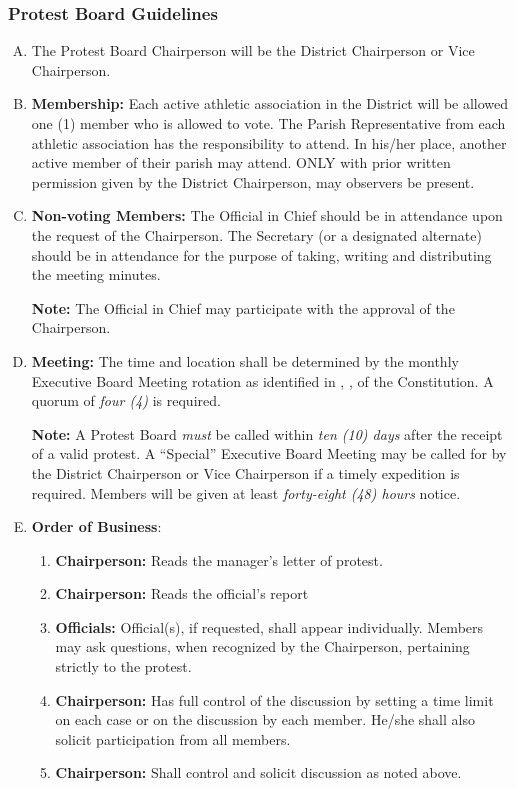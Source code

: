 \subsubsection{Protest Board Guidelines}
\begin{enumerate}[A.]
    \item The Protest Board Chairperson will be the District Chairperson or Vice Chairperson.
    \item \textbf{Membership:}
    Each active athletic association in the District will be allowed one (1) member who is allowed to vote.  The Parish Representative from each athletic association has the responsibility to attend.  In his/her place, another active member of their parish may attend.  ONLY with prior written permission given by the District Chairperson, may observers be present.
    \item \textbf{Non-voting Members:}
    The Official in Chief should be in attendance upon the request of the Chairperson. The Secretary (or a designated alternate) should be in attendance for the purpose of taking, writing and distributing the meeting minutes. 
    
    \textbf{Note:}  The Official in Chief may participate with the approval of the Chairperson. 
	 
    \item \textbf{Meeting:} 
    The time and location shall be determined by the monthly Executive Board Meeting rotation as identified in , , of the Constitution.  A quorum of {\em four (4)} is required.
    
    \textbf{Note:}  A Protest Board {\em must} be called within {\em ten (10) days} after the receipt of a valid protest.  A ``Special'' Executive Board Meeting may be called for by the District Chairperson or Vice Chairperson if a timely expedition is required. Members will be given at least {\em forty-eight (48) hours} notice.

    \item \textbf{Order of Business}:
    \begin{enumerate}
        \item \textbf{Chairperson:} Reads the manager's letter of protest.
        \item \textbf{Chairperson:} Reads the official's report
        \item \textbf{Officials:} Official(s), if requested, shall appear individually.  Members may ask questions, when recognized by the Chairperson, pertaining strictly to the protest.
        \item \textbf{Chairperson:} Has full control of the discussion by setting a time limit on each case or on the discussion by each member. He/she shall also solicit participation from all members.
        \item \textbf{Chairperson:} Shall control and solicit discussion as noted above.
    \end{enumerate}


\end{enumerate}
